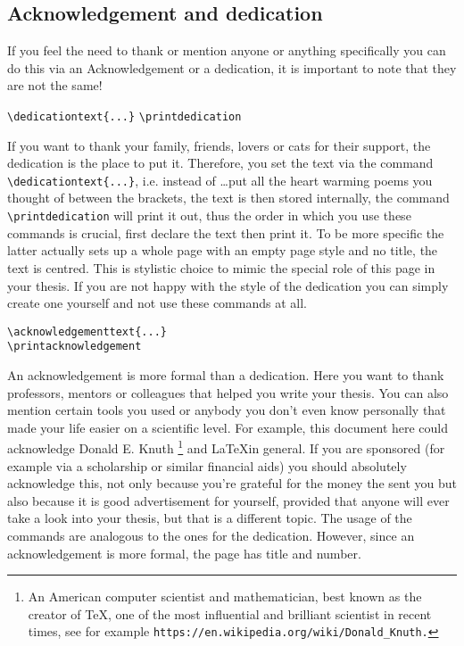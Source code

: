 \subsection{Acknowledgement and dedication}
If you feel the need to thank or mention anyone or anything specifically you can do this 
via an Acknowledgement or a dedication, it is important to note that they are not the same!
\begin{emphBox}
\lstinline|\dedicationtext{...}|
\lstinline|\printdedication|	
\end{emphBox}
If you want to thank your family, friends, lovers or cats for their support, the dedication 
is the place to put it. Therefore, you set the text via the command 
\lstinline|\dedicationtext{...}|, i.e. instead of \ldots put all the heart warming poems 
you thought of between the brackets, the text is then stored internally, the command 
\lstinline|\printdedication| will print it out, thus the order in which you use these 
commands is crucial, first declare the text then print it. To be more specific the latter 
actually sets up a whole page with an empty page style and no title, the text is centred. 
This is stylistic 
choice to mimic the special role of this page in your thesis. If you are not happy with the 
style of the dedication you can simply create one yourself and not use these commands at all.
\begin{emphBox}
\lstinline|\acknowledgementtext{...}|\\
\lstinline|\printacknowledgement|	
\end{emphBox}
An acknowledgement is more formal than a dedication. Here you want to thank professors, 
mentors or colleagues that helped you write your thesis. You can also mention certain 
tools you used or anybody you don't even know personally that made your life easier 
on a scientific level. For example, this document here could acknowledge 
Donald E. Knuth \footnote{An American computer scientist and mathematician, best known 
as the creator of \TeX, one of the most influential and brilliant scientist in recent 
times, see for example \texttt{https://en.wikipedia.org/wiki/Donald\_Knuth.}}
and \LaTeX in general. If you are sponsored (for example via a scholarship or 
similar financial aids) you should absolutely acknowledge this, not only because you're 
grateful for the money the sent you but also because it is good advertisement for 
yourself, provided that anyone will ever take a look into your thesis, but that is a 
different topic.
The usage of the commands are analogous to the ones for the dedication. However, since 
an acknowledgement is more formal, the page has title and number.
